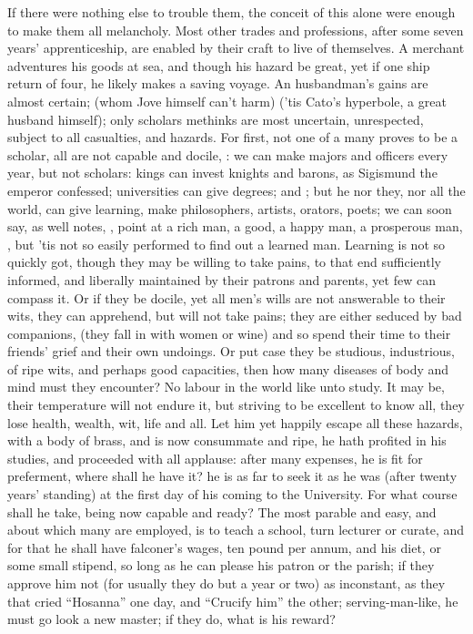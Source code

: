 If there were nothing else to trouble them, the conceit of this alone were
enough to make them all melancholy. Most other trades and professions, after
some seven years' apprenticeship, are enabled by their craft to live of
themselves. A merchant adventures his goods at sea, and though his hazard be
great, yet if one ship return of four, he likely makes a saving voyage. An
husbandman's gains are almost certain;  (whom Jove himself can't harm) ('tis Cato's
hyperbole, a great husband himself); only scholars methinks are most uncertain,
unrespected, subject to all casualties, and hazards. For first, not one of a
many proves to be a scholar, all are not capable and docile,
: we can make majors
and officers every year, but not scholars: kings can invest knights and barons,
as Sigismund the emperor confessed; universities can give degrees; and ; but he nor they, nor all the world,
can give learning, make philosophers, artists, orators, poets; we can soon say,
as \Seneca{} well notes, , point at a rich man, a
good, a happy man, a prosperous man, , but 'tis not so easily performed to find out a learned man.
Learning is not so quickly got, though they may be willing to take pains, to
that end sufficiently informed, and liberally maintained by their patrons and
parents, yet few can compass it. Or if they be docile, yet all men's wills are
not answerable to their wits, they can apprehend, but will not take pains; they
are either seduced by bad companions,  (they fall in with women or wine) and so spend their time to their
friends' grief and their own undoings. Or put case they be studious,
industrious, of ripe wits, and perhaps good capacities, then how many diseases
of body and mind must they encounter? No labour in the world like unto study.
It may be, their temperature will not endure it, but striving to be excellent
to know all, they lose health, wealth, wit, life and all. Let him yet happily
escape all these hazards,  with a body of brass, and is
now consummate and ripe, he hath profited in his studies, and proceeded with
all applause: after many expenses, he is fit for preferment, where shall he
have it? he is as far to seek it as he was (after twenty years' standing) at
the first day of his coming to the University. For what course shall he take,
being now capable and ready? The most parable and easy, and about which many
are employed, is to teach a school, turn lecturer or curate, and for that he
shall have falconer's wages, ten pound per annum, and his diet, or some small
stipend, so long as he can please his patron or the parish; if they approve him
not (for usually they do but a year or two) as inconstant, as
they that cried \enquote{Hosanna} one day, and \enquote{Crucify him} the
other; serving-man-like, he must go look a new master; if they do, what is his
reward?

